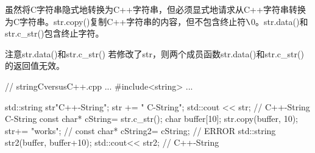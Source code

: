 
虽然将C字符串隐式地转换为C++字符串，但必须显式地请求从C++字符串转换为C字符串。str.copy()复制C++字符串的内容，但不包含终止符$ \verb|\|$0。str.data()和str.c\_str()包含终止字符。

\begin{myWarning}{注意str.data()和str.c\_str()}
若修改了str，则两个成员函数str.data()和str.c\_str()的返回值无效。


\begin{cpp}
// stringCversusC++.cpp
...
#include<string>
...

std::string str{"C++-String"};
str += " C-String";
std::cout << str; // C++-String C-String
const char* cString= str.c_str();
char buffer[10];
str.copy(buffer, 10);
str+= "works";
// const char* cString2= cString; // ERROR
std::string str2(buffer, buffer+10);
std::cout<< str2; // C++-String
\end{cpp}
\end{myWarning}































